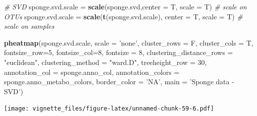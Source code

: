 \documentclass[]{book}
\newenvironment{Shaded}{\begin{snugshade}}{\end{snugshade}}
\newcommand{\KeywordTok}[1]{\textcolor[rgb]{0.13,0.29,0.53}{\textbf{#1}}}
\newcommand{\DataTypeTok}[1]{\textcolor[rgb]{0.13,0.29,0.53}{#1}}
\newcommand{\DecValTok}[1]{\textcolor[rgb]{0.00,0.00,0.81}{#1}}
\newcommand{\StringTok}[1]{\textcolor[rgb]{0.31,0.60,0.02}{#1}}
\newcommand{\CommentTok}[1]{\textcolor[rgb]{0.56,0.35,0.01}{\textit{#1}}}
\newcommand{\NormalTok}[1]{#1}
\begin{document}
\begin{Shaded}
\begin{Highlighting}[]
\CommentTok{# SVD}
\NormalTok{sponge.svd.scale =}\StringTok{ }\KeywordTok{scale}\NormalTok{(sponge.svd,}\DataTypeTok{center =}\NormalTok{ T, }\DataTypeTok{scale =}\NormalTok{ T) }\CommentTok{# scale on OTUs}
\NormalTok{sponge.svd.scale =}\StringTok{ }\KeywordTok{scale}\NormalTok{(}\KeywordTok{t}\NormalTok{(sponge.svd.scale), }\DataTypeTok{center =}\NormalTok{ T, }\DataTypeTok{scale =}\NormalTok{ T) }\CommentTok{# scale on samples}

\KeywordTok{pheatmap}\NormalTok{(sponge.svd.scale, }
         \DataTypeTok{scale =} \StringTok{'none'}\NormalTok{, }
         \DataTypeTok{cluster_rows =}\NormalTok{ F, }
         \DataTypeTok{cluster_cols =}\NormalTok{ T, }
         \DataTypeTok{fontsize_row=}\DecValTok{5}\NormalTok{, }\DataTypeTok{fontsize_col=}\DecValTok{8}\NormalTok{,}
         \DataTypeTok{fontsize =} \DecValTok{8}\NormalTok{,}
         \DataTypeTok{clustering_distance_rows =} \StringTok{"euclidean"}\NormalTok{,}
         \DataTypeTok{clustering_method =} \StringTok{"ward.D"}\NormalTok{,}
         \DataTypeTok{treeheight_row =} \DecValTok{30}\NormalTok{,}
         \DataTypeTok{annotation_col =}\NormalTok{ sponge.anno_col,}
         \DataTypeTok{annotation_colors =}\NormalTok{ sponge.anno_metabo_colors,}
         \DataTypeTok{border_color =} \StringTok{'NA'}\NormalTok{,}
         \DataTypeTok{main =} \StringTok{'Sponge data - SVD'}\NormalTok{)}
\end{Highlighting}
\end{Shaded}

\texttt{[image: vignette\_files/figure-latex/unnamed-chunk-59-6.pdf]}
\end{document}
